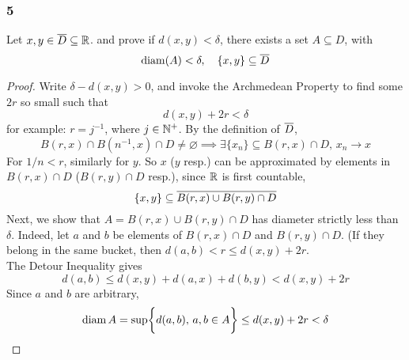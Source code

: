 \documentclass[../main.tex]{subfiles}
\begin{document}
\subsubsection*{5}
\begin{wts}
    Let $x,y\in \overline{D}\subseteq\mathbb{R}$. and prove if $d(x,y)<\delta$, there exists a set $A\subseteq D$, with \[\operatorname{diam}(A)<\delta,\quad\{x,y\}\subseteq \overline{D}\]
\end{wts}
\begin{proof}
    Write $\delta - d(x,y)>0$, and invoke the Archmedean Property to find some $2r$ so small such that\[d(x,y)+2r<\delta\]
    for example: $r = j^{-1}$, where $j\in\mathbb{N}^+$. By the definition of $\overline{D}$, 
    \[B(r,x)\cap B(n^{-1},x)\cap D\neq\varnothing\implies \exists \{x_n\}\subseteq B(r,x)\cap D,\, x_n\to x\]
    For $1/n<r$, similarly for $y$. So $x$ ($y$ resp.) can be approximated by elements in $B(r,x)\cap D$ ($B(r,y)\cap D$ resp.), since $\mathbb{R}$ is first countable, 
    \[\{x,y\}\subseteq \overline{B(r,x)\cup B(r,y)\cap D}\]
    Next, we show that $A=B(r,x)\cup B(r,y)\cap D$ has diameter strictly less than $\delta$. Indeed, let $a$ and $b$ be elements of $B(r,x)\cap D$ and $B(r,y)\cap D$. (If they belong in the same bucket, then $d(a,b)<r\leq d(x,y)+2r$.\\
    
    The Detour Inequality gives
    \[d(a,b)\leq d(x,y) + d(a,x) + d(b,y) < d(x,y) + 2r\]
    Since $a$ and $b$ are arbitrary, \[\operatorname{diam} A =\sup\biggl\{d(a,b),\,a,b\in A\biggr\}\leq d(x,y) + 2r<\delta\]
\end{proof}
\end{document}
